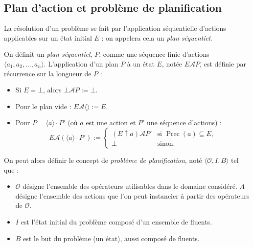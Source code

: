 \subsection{Plan d'action et problème de planification}

La résolution d'un problème se fait par l'application séquentielle d'actions applicables sur un état initial $E$ : on appelera cela un \emph{plan séquentiel}. 

\begin{definition}
    On définit un \emph{plan séquentiel}, $P$, comme une séquence finie d'actions $ \langle a_1, a_2, \dots, a_n \rangle$. L'application d'un plan $P$ à un état $E$, notée $E \mathcal{A} P$, est définie par récurrence sur la longueur de $P$ :
    \begin{itemize}
        \item Si $E = \bot$, alors $\bot \mathcal{A} P := \bot$.
        \item Pour le plan vide : $E \mathcal{A} \langle \rangle := E$.
        \item Pour $P = \langle a \rangle \cdot P'$ (où $a$ est une action et $P'$ une séquence d'actions) :
        \begin{equation}
            E \mathcal{A} (\langle a \rangle \cdot P') := 
            \begin{cases}
                (E \uparrow a) \mathcal{A} P' & \text{si } \operatorname{Prec}(a) \subseteq E, \\
                \bot & \text{sinon.}
            \end{cases}
        \end{equation}
    \end{itemize}
\end{definition}

On peut alors définir le concept de \emph{problème de planification}, noté $ \langle \mathcal{O}, I, B \rangle$ tel que :
\begin{itemize}
    \item $ \mathcal{O}$ désigne l'ensemble des opérateurs utilisables dans le domaine considéré. $A$ désigne l'ensemble des actions que l'on peut instancier à partir des opérateurs de $ \mathcal{O}$.
    \item $I$ est l'état initial du problème composé d'un ensemble de fluents.
    \item $B$ est le but du problème (un état), aussi composé de fluents.
\end{itemize}

